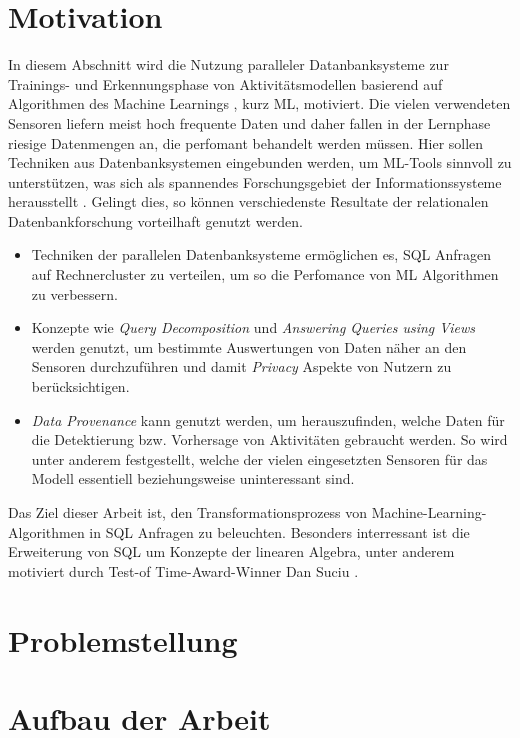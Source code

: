 \section*{Motivation}

In diesem Abschnitt wird die Nutzung paralleler Datanbanksysteme zur Trainings- und Erkennungsphase von Aktivitätsmodellen 
basierend auf Algorithmen des Machine Learnings \cite{anzai2012pattern}, kurz ML, motiviert.
Die vielen verwendeten Sensoren liefern meist hoch frequente Daten und daher fallen in der Lernphase riesige Datenmengen an, die perfomant behandelt werden müssen.
Hier sollen Techniken aus Datenbanksystemen eingebunden werden, um ML-Tools sinnvoll zu unterstützen, was sich als spannendes Forschungsgebiet der Informationssysteme herausstellt \cite{abiteboul2018research}.
Gelingt dies, so können verschiedenste Resultate der relationalen Datenbankforschung vorteilhaft genutzt werden.
\begin{itemize}
    \item Techniken der parallelen Datenbanksysteme ermöglichen es, SQL Anfragen auf Rechnercluster zu verteilen, um so die Perfomance von ML Algorithmen zu verbessern.
    \item Konzepte wie \textit{Query Decomposition} \cite{chirkova2011materialized} und \textit{Answering Queries using Views} \cite{ afrati2019answering, levy1999answering} werden genutzt, um bestimmte Auswertungen von Daten näher an den Sensoren durchzuführen und damit \textit{Privacy} \cite{agrawal2000privacy} Aspekte von Nutzern zu berücksichtigen.
    \item \textit{Data Provenance} \cite{heuer2015metis, bruder2017konzepte} kann genutzt werden, um herauszufinden, welche Daten für die Detektierung bzw. Vorhersage von Aktivitäten gebraucht werden. 
    So wird unter anderem festgestellt, welche der vielen eingesetzten Sensoren für das Modell essentiell beziehungsweise uninteressant sind.
\end{itemize} 
Das Ziel dieser Arbeit ist, den Transformationsprozess von Machine-Learning-Algorithmen in SQL Anfragen zu beleuchten. Besonders interressant ist die Erweiterung von SQL um Konzepte der linearen Algebra, unter anderem motiviert durch Test-of Time-Award-Winner Dan Suciu \cite{interviewsuciu} .


\section*{Problemstellung}

\section*{Aufbau der Arbeit}
\begin{verbatim}\end{verbatim}

